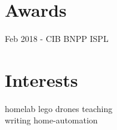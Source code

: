 \documentclass[letterpaper]{deedy-resume} %
\begin{document}
\begin{minipage}[t]{0.28\textwidth}
\sectionspace %

\section{Awards}
Feb 2018 - CIB BNPP ISPL

\sectionspace %

\section{Interests}
homelab \textbullet{} lego \textbullet{} drones \textbullet{} teaching \\
writing \textbullet{} home-automation

\end{minipage} %
\hfill
%
%
\end{document}
